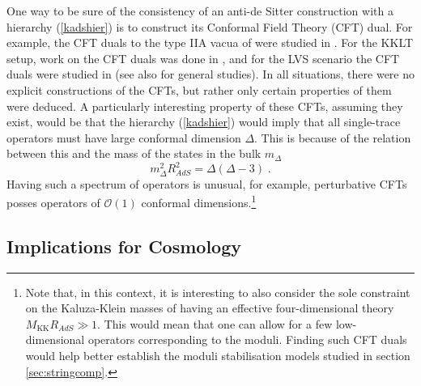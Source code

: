 \documentclass[11pt,a4paper]{article}
\numberwithin{equation}{section}
\numberwithin{table}{section}\setlength{\multlinegap}{25pt}
\newcommand{\cO}{\mathcal{O}}
\newcommand{\be}{\begin{equation}}
\newcommand{\ee}{\end{equation}}
\begin{document}
{One way to be sure of the consistency of an anti-de Sitter construction with a hierarchy (\ref{kadshier}) is to construct its Conformal Field Theory (CFT) dual. For example, the CFT duals to the type IIA vacua of \cite{DeWolfe:2005uu} were studied in \cite{Aharony:2008wz}. For the KKLT setup, work on the CFT duals was done in \cite{Silverstein:2003jp,Fabinger:2003gp,deAlwis:2014wia}, and for the LVS scenario the CFT duals were studied in \cite{deAlwis:2014wia,Conlon:2018vov} (see also \cite{Banks:2004xh,Polchinski:2009ch} for general studies). In all situations, there were no explicit constructions of the CFTs, but rather only certain properties of them were deduced. A particularly interesting property of these CFTs, assuming they exist, would be that the hierarchy (\ref{kadshier}) would imply that all single-trace operators must have large conformal dimension $\Delta$. This is because of the relation between this and the mass of the states in the bulk $m_{\Delta}$
\be
m_{\Delta}^2 R_{AdS}^2 = \Delta\left(\Delta - 3 \right) \;.
\ee
Having such a spectrum of operators is unusual, for example, perturbative CFTs posses operators of $\cO\left(1\right)$ conformal dimensions.\footnote{Note that, in this context, it is interesting to also consider the sole constraint on the Kaluza-Klein masses of having an effective four-dimensional theory $M_{\mathrm{KK}}R_{AdS} \gg 1$. This would mean that one can allow for a few low-dimensional operators corresponding to the moduli. Finding such CFT duals would help better establish the moduli stabilisation models studied in section \ref{sec:stringcomp}.}


\subsection{Implications for Cosmology}
\label{sec:imswcos}

}
\end{document}
